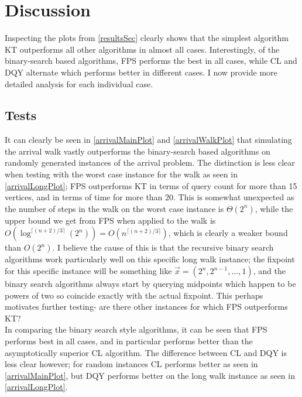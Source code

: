 \section{Discussion}
Inspecting the plots from \cref{resultsSec} clearly shows that
the simplest algorithm KT outperforms all other
algorithms in almost all cases. Interestingly, of the binary-search based
algorithms, FPS 
performs the best in all cases,
while CL and DQY alternate
which performs better in different cases. I now provide more detailed
analysis for each individual case.
\subsection{\arr Tests}
It can clearly be seen in \cref{arrivalMainPlot} and \cref{arrivalWalkPlot}
that simulating the arrival walk vastly outperforms the binary-search based
algorithms on randomly generated instances of the arrival problem.
The distinction is less clear when testing with the worst case instance
for the walk as seen in \cref{arrivalLongPlot}; FPS outperforms KT
in terms of query count for more than 15 vertices, and in terms of time for more than
20. This is somewhat unexpected as the number of steps in the walk on
the worst case instance is $\Theta(2^n)$, while the upper bound we
get from FPS when applied to the walk is 
$O(\log^{\lceil (n + 2)/3 \rceil } (2^n)) = O(n^{\lceil (n + 2)/3 \rceil})$,
which is clearly a weaker bound than $O(2^n)$. I believe the cause of this
is that the recursive binary search algorithms work particularly well
on this specific long walk instance; the fixpoint for this specific instance
will be something like $\vec{x} = (2^{n}, 2^{n - 1}, ..., 1)$, and the
binary search algorithms always start by querying midpoints which happen
to be powers of two so coincide exactly with the actual fixpoint.
This perhaps motivates further testing- are there other instances
for which FPS outperforms KT?  \\
In comparing the binary search style algorithms, it can be seen that
FPS performs best in all cases, and in particular performs better
than the asymptotically superior CL algorithm. The difference between
CL and DQY is less clear however; for random instances CL performs
better as seen in \cref{arrivalMainPlot},
but DQY performs better on the long walk instance as seen in \cref{arrivalLongPlot}.

